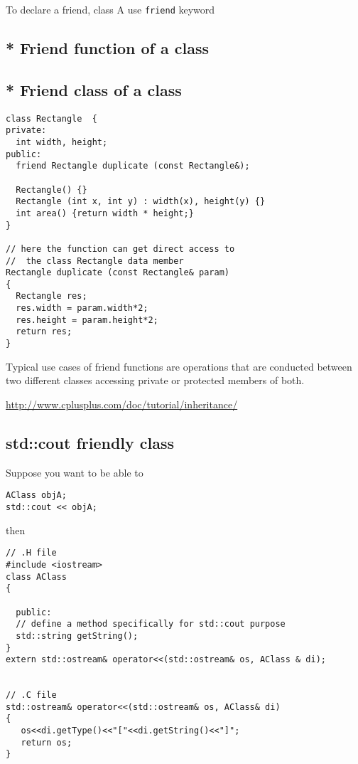 To declare a friend, class A use \verb!friend! keyword

\subsection{* Friend function of a class}


\subsection{* Friend class of a class}

\begin{lstlisting}
class Rectangle  {
private:	
  int width, height;
public:
  friend Rectangle duplicate (const Rectangle&);

  Rectangle() {}
  Rectangle (int x, int y) : width(x), height(y) {}
  int area() {return width * height;}
}

// here the function can get direct access to 
//  the class Rectangle data member
Rectangle duplicate (const Rectangle& param)
{
  Rectangle res;
  res.width = param.width*2;
  res.height = param.height*2;
  return res;
}

\end{lstlisting}
Typical use cases of friend functions are operations that are conducted between
two different classes accessing private or protected members of both. 

\url{http://www.cplusplus.com/doc/tutorial/inheritance/}

\subsection{std::cout friendly class}

Suppose you want to be able to
\begin{verbatim}
AClass objA;
std::cout << objA;
\end{verbatim}

then
\begin{lstlisting}
// .H file
#include <iostream>
class AClass 
{

  public: 
  // define a method specifically for std::cout purpose
  std::string getString();
}
extern std::ostream& operator<<(std::ostream& os, AClass & di);


// .C file
std::ostream& operator<<(std::ostream& os, AClass& di)
{
   os<<di.getType()<<"["<<di.getString()<<"]";
   return os;
}

\end{lstlisting}

